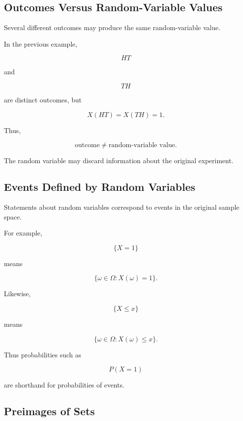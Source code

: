 \subsection{Outcomes Versus Random-Variable Values}
\label{subsec:outcomes-versus-rv-values}

Several different outcomes may produce the same random-variable value.

In the previous example,

\[
HT
\]

and

\[
TH
\]

are distinct outcomes, but

\[
X(HT)=X(TH)=1.
\]

Thus,

\[
\boxed{
\text{outcome}
\neq
\text{random-variable value}.
}
\]

The random variable may discard information about the original
experiment.

\subsection{Events Defined by Random Variables}
\label{subsec:events-defined-rv}

Statements about random variables correspond to events in the original
sample space.

For example,

\[
\{X=1\}
\]

means

\[
\boxed{
\{\omega\in\Omega:X(\omega)=1\}.
}
\]

Likewise,

\[
\{X\leq x\}
\]

means

\[
\boxed{
\{\omega\in\Omega:X(\omega)\leq x\}.
}
\]

Thus probabilities such as

\[
P(X=1)
\]

are shorthand for probabilities of events.

\subsection{Preimages of Sets}
\label{subsec:rv-preimages}

